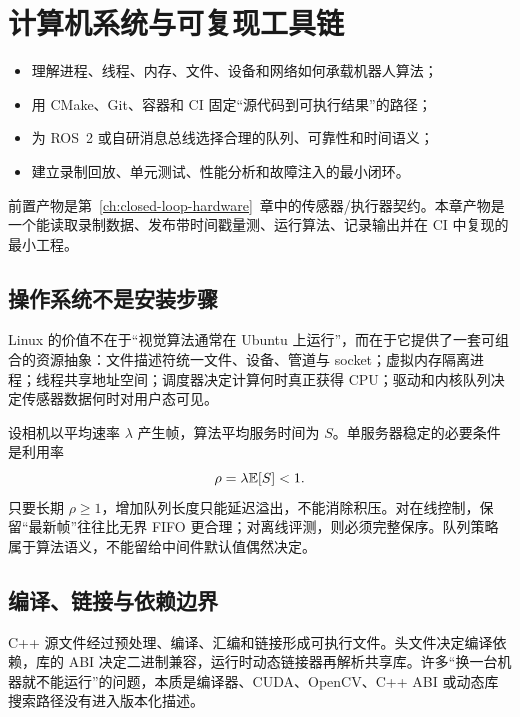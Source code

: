 \chapter{计算机系统与可复现工具链}
\label{ch:toolchain}

\begin{learningobjectives}
\begin{itemize}
  \item 理解进程、线程、内存、文件、设备和网络如何承载机器人算法；
  \item 用 CMake、Git、容器和 CI 固定“源代码到可执行结果”的路径；
  \item 为 ROS~2 或自研消息总线选择合理的队列、可靠性和时间语义；
  \item 建立录制回放、单元测试、性能分析和故障注入的最小闭环。
\end{itemize}
\end{learningobjectives}

\begin{prerequisites}
前置产物是第~\ref{ch:closed-loop-hardware}~章中的传感器/执行器契约。本章产物是一个能读取录制数据、发布带时间戳量测、运行算法、记录输出并在 CI 中复现的最小工程。
\end{prerequisites}

\section{操作系统不是安装步骤}

Linux 的价值不在于“视觉算法通常在 Ubuntu 上运行”，而在于它提供了一套可组合的资源抽象：文件描述符统一文件、设备、管道与 socket；虚拟内存隔离进程；线程共享地址空间；调度器决定计算何时真正获得 CPU；驱动和内核队列决定传感器数据何时对用户态可见。

设相机以平均速率 $\lambda$ 产生帧，算法平均服务时间为 $S$。单服务器稳定的必要条件是利用率
\begin{equation}
  \rho=\lambda\mathbb{E}[S] < 1.
\end{equation}
只要长期 $\rho\ge 1$，增加队列长度只能延迟溢出，不能消除积压。对在线控制，保留“最新帧”往往比无界 FIFO 更合理；对离线评测，则必须完整保序。队列策略属于算法语义，不能留给中间件默认值偶然决定。

\section{编译、链接与依赖边界}

C++ 源文件经过预处理、编译、汇编和链接形成可执行文件。头文件决定编译依赖，库的 ABI 决定二进制兼容，运行时动态链接器再解析共享库。许多“换一台机器就不能运行”的问题，本质是编译器、CUDA、OpenCV、C++ ABI 或动态库搜索路径没有进入版本化描述。

